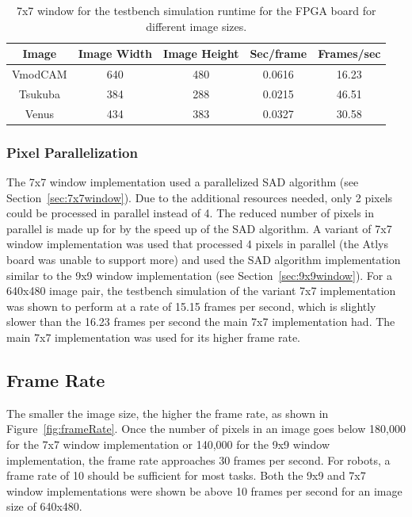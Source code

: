 \begin{table}
	\begin{center}
		\begin{tabular}{|c|c|c|c|c|}
			\hline
				\rowstyle{\bfseries} Image & 
				\rowstyle{\bfseries} Image Width & 
				\rowstyle{\bfseries} Image Height & 
				\rowstyle{\bfseries} Sec/frame & 
				\rowstyle{\bfseries} Frames/sec
			\\ \hline 
			VmodCAM & 640 & 480 & 0.0616 & 16.23
			\\ \hline 
			Tsukuba & 384 & 288 & 0.0215 & 46.51
			\\ \hline 
			Venus & 434 & 383 & 0.0327 & 30.58
			\\ \hline 
		\end{tabular}	
		\captionfonts
		\caption{7x7 window for the testbench simulation runtime for the FPGA board for different image sizes.}
		\label{table:tb_7x7}
	\end{center}
\end{table}

\subsubsection{Pixel Parallelization}
\label{sec:7x7pixelParallel4}

The 7x7 window implementation used a parallelized SAD algorithm (see Section~\ref{sec:7x7window}). Due to the additional resources needed, only 2 pixels could be processed in parallel instead of 4. The reduced number of pixels in parallel is made up for by the speed up of the SAD algorithm. A variant of 7x7 window implementation was used that processed 4 pixels in parallel (the Atlys board was unable to support more) and used the SAD algorithm implementation similar to the 9x9 window implementation (see Section~\ref{sec:9x9window}). For a 640x480 image pair, the testbench simulation of the variant 7x7 implementation was shown to perform at a rate of 15.15 frames per second, which is slightly slower than the 16.23 frames per second the main 7x7 implementation had. The main 7x7 implementation was used for its higher frame rate.

\subsection{Frame Rate}
\label{sec:frameRate}

The smaller the image size, the higher the frame rate, as shown in Figure~\ref{fig:frameRate}. Once the number of pixels in an image goes below 180,000 for the 7x7 window implementation or 140,000 for the 9x9 window implementation, the frame rate approaches 30 frames per second. For robots, a frame rate of 10 should be sufficient for most tasks. Both the 9x9 and 7x7 window implementations were shown be above 10 frames per second for an image size of 640x480.

